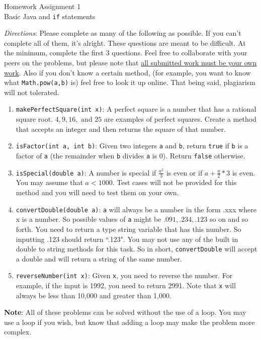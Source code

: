 \documentclass[11pt,fleqn]{article}
\theoremstyle{definition}
\begin{document}
\begin{center}
{\Huge
Homework Assignment 1
}\\
Basic Java and \texttt{if} statements
\end{center}

\textit{Directions}: Please complete as many of the following as possible. If
you can't complete all of them, it's alright. These questions are meant to
be difficult. At the minimum, complete the first 3 questions. Feel free to
collaborate with your peers on the problems, but please note that \underline{all
submitted work must be your own work}. Also if you don't know a certain method,
(for example, you want to know what \texttt{Math.pow(a,b)} is) feel free to look it
up online. That being said, plagiarism will not tolerated.  

\begin{enumerate}[Q1.]

\item
\texttt{makePerfectSquare(int x)}: A perfect square is a number that has a rational square root. $4, 9, 16, \text{ and } 25$ are examples of perfect squares. Create a method that accepts an integer and then returns the square of that number.

\item
\texttt{isFactor(int a, int b)}: Given two integers \texttt{a} and \texttt{b}, return \texttt{true} if \texttt{b} is a factor of \texttt{a} (the remainder when \texttt{b} divides \texttt{a} is 0). Return \texttt{false} otherwise.

\item
\texttt{isSpecial(double a)}: A number is special if $\frac{a^2}{3}$ is even or if
$a + \frac{a}{2} * 3$ is even. You may assume that $a<1000$. Test cases will not
be provided for this method and you will need to test them on your own. 

\item
\texttt{convertDouble(double a)}: \texttt{a} will always be a number in the form
.xxx where x is a number. So possible values of \texttt{a} might be $.091, .234,
.123$ so on and so forth. You need to return a type string variable that has
this number. So inputting .123 should return ``.123". You may not use any of the
built in double to string methods for this task.  
 So in short, \texttt{convertDouble} will accept a double  and will
return a string of the same number. 

\item
\texttt{reverseNumber(int x)}: Given \texttt{x}, you need to reverse the number.
For example, if the input is 1992, you need to return 2991. Note that \texttt{x}
will always be less than 10,000 and greater than 1,000. 

\end{enumerate}

\textbf{Note}: All of these problems can be solved without the use of a loop.
You may use a loop if you wish, but know that adding a loop may make the problem
more complex. 
\end{document}
